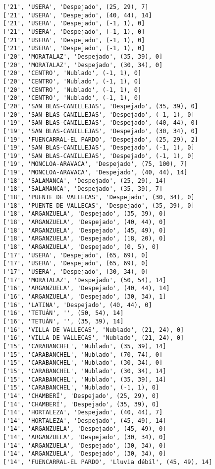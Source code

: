 \documentclass[11pt]{article}
\begin{document}
\begin{Verbatim}[commandchars=\\\{\}]
['21', 'USERA', 'Despejado', (25, 29), 7]
['21', 'USERA', 'Despejado', (40, 44), 14]
['21', 'USERA', 'Despejado', (-1, 1), 0]
['21', 'USERA', 'Despejado', (-1, 1), 0]
['21', 'USERA', 'Despejado', (-1, 1), 0]
['21', 'USERA', 'Despejado', (-1, 1), 0]
['20', 'MORATALAZ', 'Despejado', (35, 39), 0]
['20', 'MORATALAZ', 'Despejado', (30, 34), 0]
['20', 'CENTRO', 'Nublado', (-1, 1), 0]
['20', 'CENTRO', 'Nublado', (-1, 1), 0]
['20', 'CENTRO', 'Nublado', (-1, 1), 0]
['20', 'CENTRO', 'Nublado', (-1, 1), 0]
['20', 'SAN BLAS-CANILLEJAS', 'Despejado', (35, 39), 0]
['20', 'SAN BLAS-CANILLEJAS', 'Despejado', (-1, 1), 0]
['19', 'SAN BLAS-CANILLEJAS', 'Despejado', (40, 44), 0]
['19', 'SAN BLAS-CANILLEJAS', 'Despejado', (30, 34), 0]
['19', 'FUENCARRAL-EL PARDO', 'Despejado', (25, 29), 2]
['19', 'SAN BLAS-CANILLEJAS', 'Despejado', (-1, 1), 0]
['19', 'SAN BLAS-CANILLEJAS', 'Despejado', (-1, 1), 0]
['19', 'MONCLOA-ARAVACA', 'Despejado', (75, 100), 7]
['19', 'MONCLOA-ARAVACA', 'Despejado', (40, 44), 14]
['18', 'SALAMANCA', 'Despejado', (25, 29), 14]
['18', 'SALAMANCA', 'Despejado', (35, 39), 7]
['18', 'PUENTE DE VALLECAS', 'Despejado', (30, 34), 0]
['18', 'PUENTE DE VALLECAS', 'Despejado', (35, 39), 0]
['18', 'ARGANZUELA', 'Despejado', (35, 39), 0]
['18', 'ARGANZUELA', 'Despejado', (40, 44), 0]
['18', 'ARGANZUELA', 'Despejado', (45, 49), 0]
['18', 'ARGANZUELA', 'Despejado', (18, 20), 0]
['18', 'ARGANZUELA', 'Despejado', (0, 5), 0]
['17', 'USERA', 'Despejado', (65, 69), 0]
['17', 'USERA', 'Despejado', (65, 69), 0]
['17', 'USERA', 'Despejado', (30, 34), 0]
['17', 'MORATALAZ', 'Despejado', (50, 54), 14]
['16', 'ARGANZUELA', 'Despejado', (40, 44), 14]
['16', 'ARGANZUELA', 'Despejado', (30, 34), 1]
['16', 'LATINA', 'Despejado', (40, 44), 0]
['16', 'TETUÁN', '', (50, 54), 14]
['16', 'TETUÁN', '', (35, 39), 14]
['16', 'VILLA DE VALLECAS', 'Nublado', (21, 24), 0]
['16', 'VILLA DE VALLECAS', 'Nublado', (21, 24), 0]
['15', 'CARABANCHEL', 'Nublado', (35, 39), 14]
['15', 'CARABANCHEL', 'Nublado', (70, 74), 0]
['15', 'CARABANCHEL', 'Nublado', (30, 34), 0]
['15', 'CARABANCHEL', 'Nublado', (30, 34), 14]
['15', 'CARABANCHEL', 'Nublado', (35, 39), 14]
['15', 'CARABANCHEL', 'Nublado', (-1, 1), 0]
['14', 'CHAMBERÍ', 'Despejado', (25, 29), 0]
['14', 'CHAMBERÍ', 'Despejado', (35, 39), 0]
['14', 'HORTALEZA', 'Despejado', (40, 44), 7]
['14', 'HORTALEZA', 'Despejado', (45, 49), 14]
['14', 'ARGANZUELA', 'Despejado', (45, 49), 0]
['14', 'ARGANZUELA', 'Despejado', (30, 34), 0]
['14', 'ARGANZUELA', 'Despejado', (30, 34), 0]
['14', 'ARGANZUELA', 'Despejado', (30, 34), 0]
['14', 'FUENCARRAL-EL PARDO', 'Lluvia débil', (45, 49), 14]

\end{Verbatim}
\end{document}
